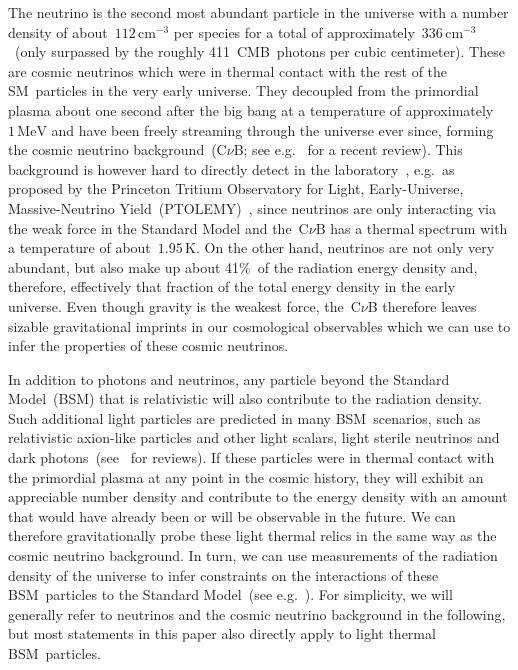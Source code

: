 The neutrino is the second most abundant particle in the universe with a number density of about~$112\,\mathrm{cm}^{-3}$ per species for a total of approximately~$336\,\mathrm{cm}^{-3}$~(only surpassed by the roughly 411~CMB~photons per cubic centimeter). These are cosmic neutrinos which were in thermal contact with the rest of the SM~particles in the very early universe. They decoupled from the primordial plasma about one second after the big bang at a temperature of approximately~$1\,\mathrm{MeV}$ and have been freely streaming through the universe ever since, forming the cosmic neutrino background~(C$\nu$B; see e.g.~\cite{Scott:2024rwc} for a recent review). This background is however hard to directly detect in the laboratory~\cite{Bauer:2022lri}, e.g.\ as proposed by the Princeton Tritium Observatory for Light, Early-Universe, Massive-Neutrino Yield~(PTOLEMY)~\cite{PTOLEMY:2019hkd}, since neutrinos are only interacting via the weak force in the Standard Model and the~C$\nu$B has a thermal spectrum with a temperature of about~$1.95\,\mathrm{K}$. On the other hand, neutrinos are not only very abundant, but also make up about 41\%~of the radiation energy density and, therefore, effectively that fraction of the total energy density in the early universe. Even though gravity is the weakest force, the~C$\nu$B therefore leaves sizable gravitational imprints in our cosmological observables which we can use to infer the properties of these cosmic neutrinos.\medskip

In addition to photons and neutrinos, any particle beyond the Standard Model~(BSM) that is relativistic will also contribute to the radiation density. Such additional light particles are predicted in many BSM~scenarios, such as relativistic axion-like particles and other light scalars, light sterile neutrinos and dark photons~(see~\cite{Abazajian:2012ys, Marsh:2015xka, Hook:2018dlk, Green:2019glg, Allahverdi:2020bys, Asadi:2022njl, Dvorkin:2022jyg, Antel:2023hkf} for reviews). If these particles were in thermal contact with the primordial plasma at any point in the cosmic history, they will exhibit an appreciable number density and contribute to the energy density with an amount that would have already been or will be observable in the future. We can therefore gravitationally probe these light thermal relics in the same way as the cosmic neutrino background. In turn, we can use measurements of the radiation density of the universe to infer constraints on the interactions of these BSM~particles to the Standard Model~(see e.g.~\cite{Brust:2013ova, Chacko:2015noa, Baumann:2016wac, Ferreira:2018vjj, DEramo:2018vss, Arias-Aragon:2020shv, Ghosh:2020vti, Ferreira:2020bpb, Dror:2021nyr, Green:2021hjh, DEramo:2021usm, Caloni:2022uya, Bianchini:2023ubu, DEramo:2023nzt, Badziak:2024szg, Badziak:2024qjg, DEramo:2024jhn}). For simplicity, we will generally refer to neutrinos and the cosmic neutrino background in the following, but most statements in this paper also directly apply to light thermal BSM~particles.\medskip

